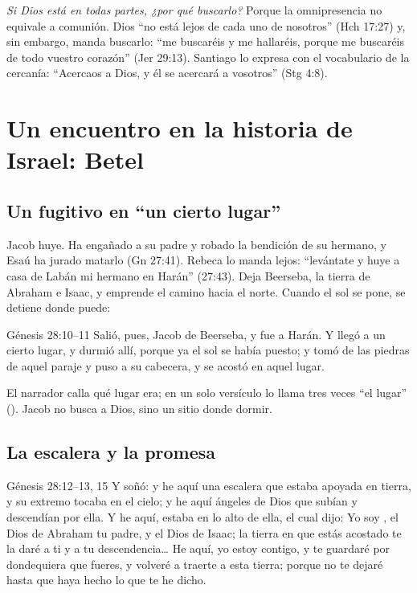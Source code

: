 
\emph{Si Dios está en todas partes, ¿por qué buscarlo?} Porque la omnipresencia no equivale a comunión. Dios ``no está lejos de cada uno de nosotros'' (Hch 17:27) y, sin embargo, manda buscarlo: ``me buscaréis y me hallaréis, porque me buscaréis de todo vuestro corazón'' (Jer 29:13). Santiago lo expresa con el vocabulario de la cercanía: ``Acercaos a Dios, y él se acercará a vosotros'' (Stg 4:8).

\section{Un encuentro en la historia de Israel: Betel}

\subsection{Un fugitivo en “un cierto lugar”}

Jacob huye. Ha engañado a su padre y robado la bendición de su hermano, y Esaú ha jurado matarlo (Gn 27:41). Rebeca lo manda lejos: ``levántate y huye a casa de Labán mi hermano en Harán'' (27:43). Deja Beerseba, la tierra de Abraham e Isaac, y emprende el camino hacia el norte. Cuando el sol se pone, se detiene donde puede:

\begin{verso}{Génesis 28:10–11}
Salió, pues, Jacob de Beerseba, y fue a Harán. Y llegó a un cierto lugar, y durmió allí, porque ya el sol se había puesto; y tomó de las piedras de aquel paraje y puso a su cabecera, y se acostó en aquel lugar.
\end{verso}

El narrador calla qué lugar era; en un solo versículo lo llama tres veces ``el lugar'' (). Jacob no busca a Dios, sino un sitio donde dormir.

\subsection{La escalera y la promesa}

\begin{verso}{Génesis 28:12–13, 15}
Y soñó: y he aquí una escalera que estaba apoyada en tierra, y su extremo tocaba en el cielo; y he aquí ángeles de Dios que subían y descendían por ella. Y he aquí, \SENOR{} estaba en lo alto de ella, el cual dijo: Yo soy \SENOR{}, el Dios de Abraham tu padre, y el Dios de Isaac; la tierra en que estás acostado te la daré a ti y a tu descendencia\ldots{} He aquí, yo estoy contigo, y te guardaré por dondequiera que fueres, y volveré a traerte a esta tierra; porque no te dejaré hasta que haya hecho lo que te he dicho.
\end{verso}

